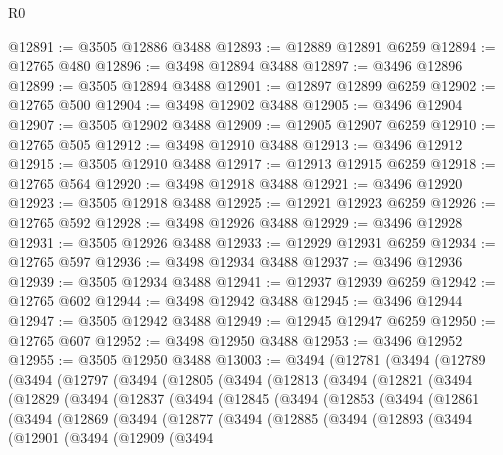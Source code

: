 \begin{lexlean}{R0}
\begin{coremodule}
@12891 := @3505 @12886 @3488
@12893 := @12889 @12891 @6259
@12894 := @12765 @480
@12896 := @3498 @12894 @3488
@12897 := @3496 @12896
@12899 := @3505 @12894 @3488
@12901 := @12897 @12899 @6259
@12902 := @12765 @500
@12904 := @3498 @12902 @3488
@12905 := @3496 @12904
@12907 := @3505 @12902 @3488
@12909 := @12905 @12907 @6259
@12910 := @12765 @505
@12912 := @3498 @12910 @3488
@12913 := @3496 @12912
@12915 := @3505 @12910 @3488
@12917 := @12913 @12915 @6259
@12918 := @12765 @564
@12920 := @3498 @12918 @3488
@12921 := @3496 @12920
@12923 := @3505 @12918 @3488
@12925 := @12921 @12923 @6259
@12926 := @12765 @592
@12928 := @3498 @12926 @3488
@12929 := @3496 @12928
@12931 := @3505 @12926 @3488
@12933 := @12929 @12931 @6259
@12934 := @12765 @597
@12936 := @3498 @12934 @3488
@12937 := @3496 @12936
@12939 := @3505 @12934 @3488
@12941 := @12937 @12939 @6259
@12942 := @12765 @602
@12944 := @3498 @12942 @3488
@12945 := @3496 @12944
@12947 := @3505 @12942 @3488
@12949 := @12945 @12947 @6259
@12950 := @12765 @607
@12952 := @3498 @12950 @3488
@12953 := @3496 @12952
@12955 := @3505 @12950 @3488
@13003 := @3494
    (@12781
      (@3494
        (@12789
          (@3494
            (@12797
              (@3494
                (@12805
                  (@3494
                    (@12813
                      (@3494
                        (@12821
                          (@3494
                            (@12829
                              (@3494
                                (@12837
                                  (@3494
                                    (@12845
                                      (@3494
                                        (@12853
                                          (@3494
                                            (@12861
                                              (@3494
                                                (@12869
                                                  (@3494
                                                    (@12877
                                                      (@3494
                                                        (@12885
                                                          (@3494
                                                            (@12893
                                                              (@3494
                                                                (@12901
                                                                  (@3494
                                                                    (@12909
                                                                      (@3494

\end{coremodule}
\end{lexlean}
